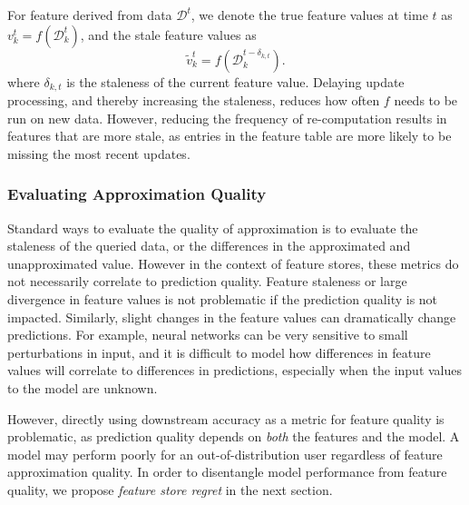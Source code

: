 For feature derived from data $\mathcal{D}^{t}$, we denote the true feature values at time $t$ as $v^t_k = f\left( \mathcal{D}^{t}_k\right)$, and the stale feature values as 
\begin{equation}
    \tilde{v}^t_k = f\left( \mathcal{D}^{t-\delta_{k,t}}_k\right).\label{eqn:delayedupdate}
\end{equation}
where $\delta_{k,t}$ is the staleness of the current feature value.  Delaying update processing, and thereby increasing the staleness, reduces how often $f$ needs to be run on new data. However, reducing the frequency of re-computation results in features that are more stale, as entries in the feature table are more likely to be missing the most recent updates. 

\subsubsection{Evaluating Approximation Quality} Standard ways to evaluate the quality of approximation is to evaluate the staleness of the queried data, or the differences in the approximated and unapproximated value. However in the context of feature stores, these metrics do not necessarily correlate to prediction quality. Feature staleness or large divergence in feature values is not problematic if the prediction quality is not impacted. Similarly, slight changes in the feature values can dramatically change predictions. For example, neural networks can be very sensitive to small perturbations in input, and it is difficult to model how differences in feature values will correlate to differences in predictions, especially when the input values to the model are unknown.  

However, directly using downstream accuracy as a metric for feature quality is problematic, as prediction quality depends on \textit{both} the features and the model. A model may perform poorly for an out-of-distribution user regardless of feature approximation quality. In order to disentangle model performance from feature quality, we propose \textit{feature store regret} in the next section. 




